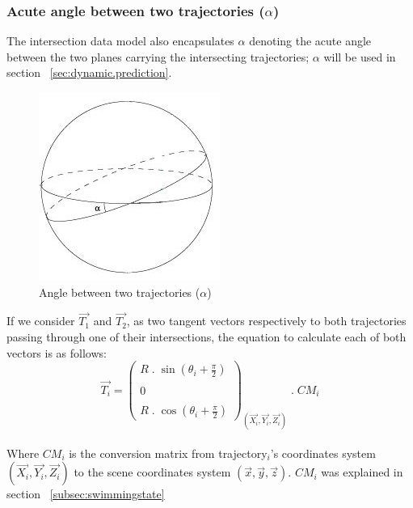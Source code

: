 \subsubsection{Acute angle between two trajectories ($\alpha$)}
The intersection data model also encapsulates $\alpha$ denoting the acute angle between the two planes carrying the intersecting trajectories; $\alpha$ will be used in section ~\ref{sec:dynamic.prediction}.

\begin{figure}[H]
   \centering
   \includegraphics[scale=1]{figures/angles.jpeg}
   \caption{Angle between two trajectories ($\alpha$)}
   \label{fig:angles}
\end{figure}

If we consider $\overrightarrow{T_1}$ and $\overrightarrow{T_2}$, as two tangent vectors respectively to both trajectories passing through one of their intersections, the equation to calculate each of both vectors is as follows:\\

\[
\overrightarrow{T_i} = \left(
\begin{array}{ccc}
R \; . \; \sin \left( \theta_i + \frac{\displaystyle \pi}{2} \right) \\ \\
0 \\ \\
R \; . \; \cos \left( \theta_i + \frac{\displaystyle \pi}{2} \right)
\end{array}
\right)_{(\overrightarrow{X_i}, \overrightarrow{Y_i}, \overrightarrow{Z_i})} \; . \; CM_i
\] \\
Where $CM_i$ is the conversion matrix from trajectory$_i$'s coordinates system $(\overrightarrow{X_i}, \overrightarrow{Y_i}, \overrightarrow{Z_i})$ to the scene coordinates system $(\overrightarrow{x}, \overrightarrow{y}, \overrightarrow{z})$. $CM_i$ was explained in section ~\ref{subsec:swimmingstate}\\

